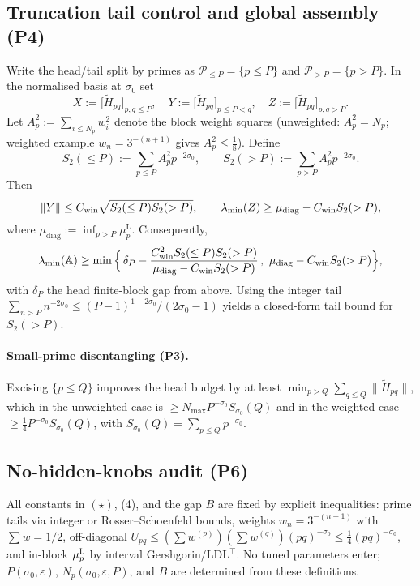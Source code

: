 \documentclass[11pt]{article}
\theoremstyle{definition}
\theoremstyle{remark}
\begin{document}
\vspace{1.0cm}
\subsection*{Truncation tail control and global assembly (P4)}
Write the head/tail split by primes as $\mathcal P_{\le P}=\{p\le P\}$ and $\mathcal P_{>P}=\{p>P\}$. In the normalised basis at $\sigma_0$ set
\[ X:=\bigl[\widetilde H_{pq}\bigr]_{p,q\le P},\quad Y:=\bigl[\widetilde H_{pq}\bigr]_{p\le P<q},\quad Z:=\bigl[\widetilde H_{pq}\bigr]_{p,q>P}. \]
Let $A_p^2:=\sum_{i\le N_p} w_i^2$ denote the block weight squares (unweighted: $A_p^2=N_p$; weighted example $w_n=3^{-(n+1)}$ gives $A_p^2\le\tfrac18$). Define
\[ S_2(\le P):=\sum_{p\le P} A_p^2 p^{-2\sigma_0},\qquad S_2(>P):=\sum_{p>P} A_p^2 p^{-2\sigma_0}. \]
Then
\[ \|Y\|\le C_{\rm win}\sqrt{S_2(\le P)S_2(>P)},\qquad \lambda_{\min}(Z)\ge \mu_{\mathrm{diag}}-C_{\rm win}S_2(>P), \]
where $\mu_{\mathrm{diag}}:=\inf_{p>P}\mu_p^{\mathrm L}$. Consequently,
\[ \lambda_{\min}(\mathbb A)\ge \min\Big\{\,\delta_P - \dfrac{C_{\rm win}^2 S_2(\le P)S_2(>P)}{\mu_{\mathrm{diag}}-C_{\rm win}S_2(>P)}\,,\ \mu_{\mathrm{diag}}-C_{\rm win}S_2(>P)\Big\}, \]
with $\delta_P$ the head finite-block gap from above. Using the integer tail $\sum_{n>P}n^{-2\sigma_0}\le (P-1)^{1-2\sigma_0}/(2\sigma_0-1)$ yields a closed-form tail bound for $S_2(>P)$.





\vspace{1.0cm}
\paragraph{Small-prime disentangling (P3).}
Excising $\{p\le Q\}$ improves the head budget by at least $\min_{p>Q}\sum_{q\le Q}\|\widetilde H_{pq}\|$, which in the unweighted case is $\ge N_{\max} P^{-\sigma_0} S_{\sigma_0}(Q)$ and in the weighted case $\ge \tfrac14 P^{-\sigma_0} S_{\sigma_0}(Q)$, with $S_{\sigma_0}(Q)=\sum_{p\le Q}p^{-\sigma_0}$.





\vspace{1.0cm}
\subsection*{No-hidden-knobs audit (P6)}
All constants in $(\star)$, (4), and the gap $B$ are fixed by explicit inequalities: prime tails via integer or Rosser--Schoenfeld bounds, weights $w_n=3^{-(n+1)}$ with $\sum w=1/2$, off-diagonal $U_{pq}\le (\sum w^{(p)})(\sum w^{(q)})(pq)^{-\sigma_0}\le \tfrac14 (pq)^{-\sigma_0}$, and in-block $\mu_p^{\rm L}$ by interval Gershgorin/LDL$^\top$. No tuned parameters enter; $P(\sigma_0,\varepsilon)$, $N_p(\sigma_0,\varepsilon,P)$, and $B$ are determined from these definitions.
\end{document}
